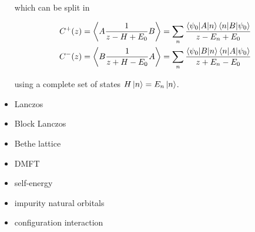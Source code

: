 \begin{itemize}
          which can be split in

          \begin{subequations}
              \begin{align}
                  C^+(z)
                   & =
                  \Braket{A \frac{1}{z - H + E_0} B}
                  =
                  \sum_n \frac{\braket{\psi_0 | A | n}\braket{n | B | \psi_0}}{z - E_n + E_0}
                  \\
                  C^-(z)
                   & =
                  \Braket{B \frac{1}{z + H - E_0} A}
                  =
                  \sum_n \frac{\braket{\psi_0 | B | n}\braket{n | A | \psi_0}}{z + E_n - E_0}
              \end{align}
          \end{subequations}

          using a complete set of states $H\ket{n} = E_n\ket{n}$.
    \item Lanczos
    \item Block Lanczos
    \item Bethe lattice
    \item DMFT
    \item self-energy
    \item impurity natural orbitals
    \item configuration interaction
\end{itemize}



